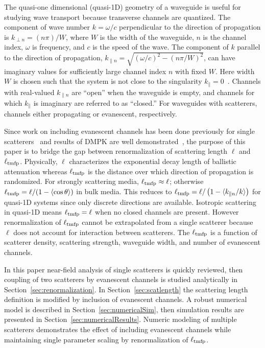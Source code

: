 The quasi-one dimensional (quasi-1D) geometry of a waveguide is useful for studying wave transport because transverse channels are quantized. The component of wave number $k = \omega/c$ perpendicular to the direction of propagation is $k_{\perp n}=(n \pi)/W$, where $W$ is the width of the waveguide, $n$ is the channel index, $\omega$ is frequency, and $c$ is the speed of the wave. The component of $k$ parallel to the direction of propagation, $k_{\parallel n}=\sqrt{(\omega/c)^2-\left(n \pi/W\right) ^2}$, can have imaginary values for sufficiently large channel index $n$ with fixed $W$. Here width $W$ is chosen such that the system is not close to the singularity $k_{\parallel}=0$~\cite{2008_Engheta_PRL}.
Channels with real-valued $k_{\parallel n}$  are ``open''  when the waveguide is empty, and channels for which $k_{\parallel}$ is imaginary are referred to as ``closed.'' For waveguides with scatterers, channels either propagating or evanescent, respectively.

Since work on including evanescent channels has been done previously for single scatterers~\cite{1990_Bagwell,2007_Froufe-Perez_PRE} and results of DMPK are well demonstrated~\cite{1997_Beenakker}, the purpose of this paper is to bridge the gap between renormalization of scattering length $\ell$ and $\ell_{\rm tmfp}$. Physically, $\ell$ characterizes the exponential decay length of ballistic attenuation whereas $\ell_{\rm tmfp}$ is the distance over which direction of propagation is randomized. For strongly scattering media, $\ell_{\rm tmfp} \approx \ell$; otherwise $\ell_{\rm tmfp} = \ell/(1-\langle \cos \theta \rangle)$ in bulk media. This reduces to $\ell_{\rm tmfp} = \ell/\left(1-\langle k_{\parallel n}/k\rangle \right)$ for quasi-1D systems since only discrete directions are available. Isotropic scattering in quasi-1D means $\ell_{\rm tmfp} = \ell$ when no closed channels are present. However renormalization of $\ell_{\rm tmfp}$ cannot be extrapolated from a single scatterer because $\ell$ does not account for interaction between scatterers. The $\ell_{\rm tmfp}$ is a function of scatterer density, scattering strength, waveguide width, and number of evanescent channels.


In this paper near-field analysis of single scatterers is quickly reviewed, then coupling of two scatterers by evanescent channels is studied analytically in Section~\ref{sec:renormalization}. In Section~\ref{sec:scatlength} the scattering length definition is modified by inclusion of evanescent channels. A robust numerical model is described in Section~\ref{sec:numericalSim}, then simulation results are presented in Section~\ref{sec:numericalResults}. Numeric modeling of multiple scatterers demonstrates the effect of including evanescent channels while maintaining single parameter scaling by renormalization of $\ell_{\rm tmfp}$. 

